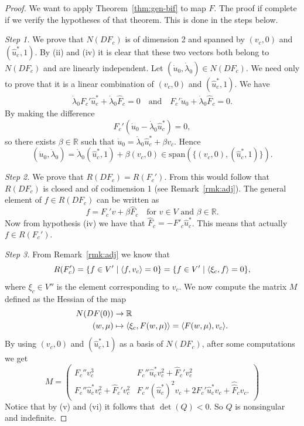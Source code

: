\documentclass[a4paper,11pt]{article}
\theoremstyle{definition}
\DeclarePairedDelimiter{\dual}{\langle}{\rangle}
\begin{document}
\begin{proof}
We want to apply Theorem~\ref{thm:gen-bif} to map $F$. The proof if complete if we verify the hypotheses of that theorem. This is done in the steps below.

\emph{Step 1.} We prove that $N(DF_c)$ is of dimension 2 and spanned by $(v_c,0)$ and $(\hat{u}^*_c,1)$. By (ii) and (iv) it is clear that these two vectors both belong to $N(DF_c)$ and are linearly independent. Let $(\dot u_0,\dot\lambda_0)\in N(DF_c)$. We need only to prove that it is a linear combination of $(v_c,0)$ and $(\hat{u}^*_c,1)$. We have
\begin{gather*}
\dot\lambda_0F_c'\hat{u}^*_c+\dot\lambda_0\hat{F}_c=0\quad\text{and}\quad F_c'\dot u_0+\dot\lambda_0\hat{F}_c=0.
\end{gather*}
By making the difference
\[
F_c'(\dot u_0-\dot\lambda_0\hat{u}^*_c)=0,
\]
so there exists $\beta\in\mathbb{R}$ such that $\dot u_0=\dot\lambda_0\hat u_c^*+\beta v_c$. Hence
\[
(\dot u_0,\dot\lambda_0)=\dot\lambda_0(\hat u_c^*,1)+\beta(v_c,0)\in\text{span}\left(\{(v_c,0),(\hat{u}^*_c,1)\}\right).
\]

\emph{Step 2.} We prove that $R(DF_c)=R(F_c')$. From this would follow that $R(DF_c)$ is closed and of codimension 1 (see Remark~\ref{rmk:adj}). The general element of $f\in R(DF_c)$ can be written as
\[
f=F_c'v+\beta\hat F_c\quad\text{for $v\in V$ and $\beta\in\mathbb{R}$}.
\]
Now from hypothesis (iv) we have that $\hat F_c=-F'_c\hat u_c^*$. This means that actually $f\in R(F_c')$.

\emph{Step 3.} From Remark~\ref*{rmk:adj} we know that
\[
R(F_c')=\{f\in V'\;|\;\dual{f,v_c}=0\}=\{f\in V'\;|\;\dual{\xi_c,f}=0\},
\]
where $\xi_c\in V''$ is the element corresponding to $v_c$. We now compute the matrix $M$ defined as the Hessian of the map
\begin{align*}
N(DF(0))&\to\mathbb{R} \\
(w,\mu)&\mapsto\dual{\xi_c,F(w,\mu)}=\dual{F(w,\mu),v_c}.
\end{align*}
By using $(v_c,0)$ and $(\hat u_c^*,1)$ as a basis of $N(DF_c)$, after some computations we get
\[
M=
\begin{pmatrix}
F_c''v_c^3 & F_c''\hat{u}_c^*v_c^2+\hat{F}_c'v_c^2 \\
F_c''\hat{u}_c^*v_c^2+\hat{F}_c'v_c^2 & F_c''(\hat{u}_c^*)^2v_c+2\hat{F}_c'\hat{u}_c^*v_c+\hat{\hat{F}}_cv_c.
\end{pmatrix}
\]
Notice that by (v) and (vi) it follows that $\det(Q)<0$. So $Q$ is nonsingular and indefinite.
\end{proof}
\end{document}
